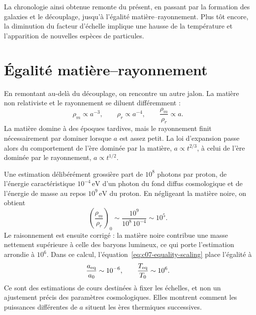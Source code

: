 \begin{classroomqa}
\end{classroomqa}

La chronologie ainsi obtenue remonte du présent, en passant par la formation des galaxies et le découplage, jusqu’à l’égalité matière--rayonnement. Plus tôt encore, la diminution du facteur d’échelle implique une hausse de la température et l’apparition de nouvelles espèces de particules.

\section{Égalité matière--rayonnement}

En remontant au-delà du découplage, on rencontre un autre jalon. La matière non relativiste et le rayonnement se diluent différemment :
\begin{equation}
\rho_m\propto a^{-3},
\qquad
\rho_r\propto a^{-4},
\qquad
\frac{\rho_m}{\rho_r}\propto a.
\label{eq:c07-equality-scaling}
\end{equation}
La matière domine à des époques tardives, mais le rayonnement finit nécessairement par dominer lorsque \(a\) est assez petit. La loi d’expansion passe alors du comportement de l’ère dominée par la matière, \(a\propto t^{2/3}\), à celui de l’ère dominée par le rayonnement, \(a\propto t^{1/2}\).

Une estimation délibérément grossière part de \(10^8\) photons par proton, de l’énergie caractéristique \(10^{-4}\,\mathrm{eV}\) d’un photon du fond diffus cosmologique et de l’énergie de masse au repos \(10^9\,\mathrm{eV}\) du proton. En négligeant la matière noire, on obtient
\begin{equation}
\left(\frac{\rho_m}{\rho_r}\right)_0
\sim
\frac{10^9}{10^8\,10^{-4}}
\sim10^5.
\end{equation}
Le raisonnement est ensuite corrigé : la matière noire contribue une masse nettement supérieure à celle des baryons lumineux, ce qui porte l’estimation arrondie à \(10^6\). Dans ce calcul, l’équation~\eqref{eq:c07-equality-scaling} place l’égalité à
\begin{equation}
\frac{a_{\rm eq}}{a_0}\sim10^{-6},
\qquad
\frac{T_{\rm eq}}{T_0}\sim10^6.
\label{eq:c07-equality-estimate}
\end{equation}
Ce sont des estimations de cours destinées à fixer les échelles, et non un ajustement précis des paramètres cosmologiques. Elles montrent comment les puissances différentes de \(a\) situent les ères thermiques successives.

